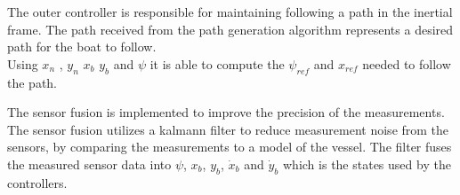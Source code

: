 The outer controller is responsible for maintaining following a path in the inertial frame. 
The path received from the path generation algorithm represents a desired path for the boat to follow. \\

Using $x_{n}$ , $y_{n}$ $x_b$ $y_b$ and $\psi$ it is able to compute the $\psi_{ref}$ and $x_{ref}$ needed to follow the path. 

The sensor fusion is implemented to improve the precision of the measurements. 
The sensor fusion utilizes a kalmann filter to reduce measurement noise from the sensors, by comparing the measurements to a model of the vessel. 
The filter fuses the measured sensor data into $\psi$, $x_{b}$, $y_{b}$, $\dot{x}_{b}$ and $\dot{y}_{b}$ which is the states used by the controllers. 

